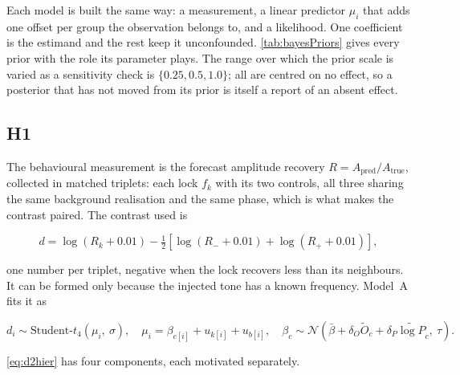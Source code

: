 Each model is built the same way: a measurement, a linear predictor $\mu_i$ that adds one offset per group the observation belongs to, and a likelihood. One coefficient is the estimand and the rest keep it unconfounded. \autoref{tab:bayesPriors} gives every prior with the role its parameter plays. The range over which the prior scale is varied as a sensitivity check is $\{0.25,0.5,1.0\}$; all are centred on no effect, so a posterior that has not moved from its prior is itself a report of an absent effect.

\subsection{H1}
The behavioural measurement is the forecast amplitude recovery $R=A_{\text{pred}}/A_{\text{true}}$, collected in matched triplets: each lock $f_k$ with its two controls, all three sharing the same background realisation and the same phase, which is what makes the contrast paired. The contrast used is

\begin{equation}
\label{eq:d2contrast}
d = \log(R_k + 0.01) - \tfrac{1}{2}\left[\log(R_- + 0.01) + \log(R_+ + 0.01)\right],
\end{equation}

one number per triplet, negative when the lock recovers less than its neighbours. It can be formed only because the injected tone has a known frequency. Model~A fits it as

\begin{equation}
\label{eq:d2hier}
d_i \sim \text{Student-}t_4(\mu_i,\ \sigma),
\quad
\mu_i = \beta_{c[i]} + u_{k[i]} + u_{b[i]},
\quad
\beta_c \sim \mathcal{N}\!\left(\bar\beta + \delta_O \widetilde O_c + \delta_P \widetilde{\log P}_c,\ \tau\right).
\end{equation}

\autoref{eq:d2hier} has four components, each motivated separately.

